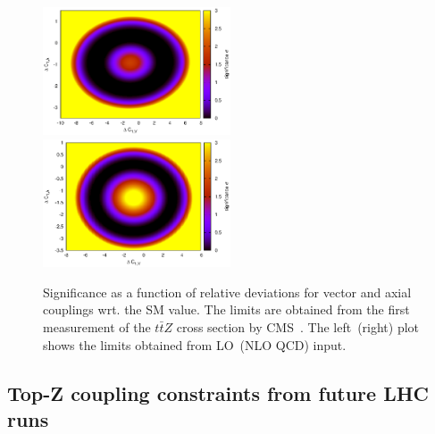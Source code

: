 \documentclass[preprint]{JHEP3} %
\def\ttbZ{t\bar{t}Z}
\begin{document}
\begin{figure}[t]
\centering %
\includegraphics[width=0.495\textwidth]{./CMSLO_Delta0.40_0213.eps}
\includegraphics[width=0.495\textwidth]{./CMSNLO_Delta0.20_0213.eps}
\caption{\label{fig:v}
Significance as a function of relative deviations for vector and axial couplings wrt. the SM value. 
The limits are obtained from the first measurement of the $\ttbZ$ cross section by CMS~\cite{Chatrchyan:2013qca}. 
The left~(right) plot shows the limits obtained from LO~(NLO QCD) input.
}
\end{figure}

\subsection{Top-Z coupling constraints from future LHC runs}
\end{document}

